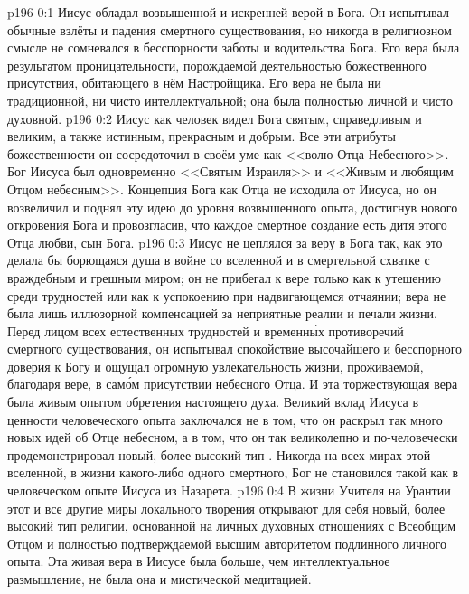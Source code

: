 \author{Промежуточные создания}
\vs p196 0:1 Иисус обладал возвышенной и искренней верой в Бога. Он испытывал обычные взлёты и падения смертного существования, но никогда в религиозном смысле не сомневался в бесспорности заботы и водительства Бога. Его вера была результатом проницательности, порождаемой деятельностью божественного присутствия, обитающего в нём Настройщика. Его вера не была ни традиционной, ни чисто интеллектуальной; она была полностью личной и чисто духовной.
\vs p196 0:2 Иисус как человек видел Бога святым, справедливым и великим, а также истинным, прекрасным и добрым. Все эти атрибуты божественности он сосредоточил в своём уме как <<волю Отца Небесного>>. Бог Иисуса был одновременно <<Святым Израиля>> и <<Живым и любящим Отцом небесным>>. Концепция Бога как Отца не исходила от Иисуса, но он возвеличил и поднял эту идею до уровня возвышенного опыта, достигнув нового откровения Бога и провозгласив, что каждое смертное создание есть дитя этого Отца любви, сын Бога.
\vs p196 0:3 Иисус не цеплялся за веру в Бога так, как это делала бы борющаяся душа в войне со вселенной и в смертельной схватке с враждебным и грешным миром; он не прибегал к вере только как к утешению среди трудностей или как к успокоению при надвигающемся отчаянии; вера не была лишь иллюзорной компенсацией за неприятные реалии и печали жизни. Перед лицом всех естественных трудностей и временн\'ых противоречий смертного существования, он испытывал спокойствие высочайшего и бесспорного доверия к Богу и ощущал огромную увлекательность жизни, проживаемой, благодаря вере, в сам\'ом присутствии небесного Отца. И эта торжествующая вера была живым опытом обретения настоящего духа. Великий вклад Иисуса в ценности человеческого опыта заключался не в том, что он раскрыл так много новых идей об Отце небесном, а в том, что он так великолепно и по\hyp{}человечески продемонстрировал новый, более высокий тип . Никогда на всех мирах этой вселенной, в жизни какого\hyp{}либо одного смертного, Бог не становился такой  как в человеческом опыте Иисуса из Назарета.
\vs p196 0:4 В жизни Учителя на Урантии этот и все другие миры локального творения открывают для себя новый, более высокий тип религии, основанной на личных духовных отношениях с Всеобщим Отцом и полностью подтверждаемой высшим авторитетом подлинного личного опыта. Эта живая вера в Иисусе была больше, чем интеллектуальное размышление, не была она и мистической медитацией.
